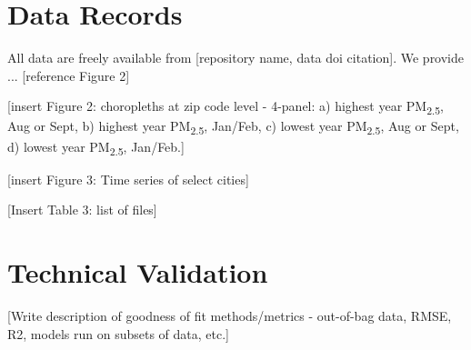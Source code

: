 \documentclass[english]{article}
\begin{document}
\section*{Data Records}



All data are freely available from [repository name, data doi citation]. We provide ... [reference Figure 2]

[insert Figure 2: choropleths at zip code level - 4-panel: a) highest year PM\textsubscript{2.5}, Aug or Sept, b) highest year PM\textsubscript{2.5}, Jan/Feb, c) lowest year PM\textsubscript{2.5}, Aug or Sept, d) lowest year PM\textsubscript{2.5}, Jan/Feb.] %

[insert Figure 3: Time series of select cities] %

[Insert Table 3: list of files]

\section*{Technical Validation}


[Write description of goodness of fit methods/metrics - out-of-bag data, RMSE, R2, models run on subsets of data, etc.]
\end{document}
